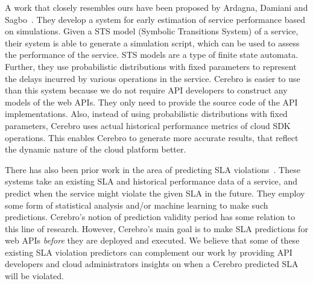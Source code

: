 A work that closely resembles ours have been proposed by Ardagna, Damiani and Sagbo~\cite{6649675}. They develop
a system for early estimation of service performance based on simulations. Given a STS
model (Symbolic Transitions System) of a service, their system is able to generate a simulation script, which
can be used to assess the performance of the service. STS models are a type of finite state automata. 
Further, they use probabilistic distributions with fixed parameters
to represent the delays incurred by various operations in the service. Cerebro is easier to use than this
system because we do not require API developers to construct any models of the web APIs. They only
need to provide the source code of the API implementations. Also, instead of using probabilistic distributions
with fixed parameters, Cerebro uses actual historical performance metrics of cloud SDK operations. This enables
Cerebro to generate more accurate results, that reflect the dynamic nature of the cloud platform better.

There has also been prior work in the area of predicting 
SLA violations~\cite{Leitner10,6976585,Duan:2006:PIP:1142473.1142582}. 
These systems take an existing SLA and historical performance data of a service, and predict when the 
service might violate the given SLA in the future. They employ some form of statistical analysis and/or machine learning to
make such predictions. Cerebro's notion of prediction validity period has some relation to this line of research. However,
Cerebro's main goal is to make SLA predictions for web APIs \textit{before} 
they are deployed and executed. We believe that
some of these existing SLA violation predictors can complement our 
work by providing API developers and cloud
administrators insights on when a Cerebro predicted SLA will be violated.
